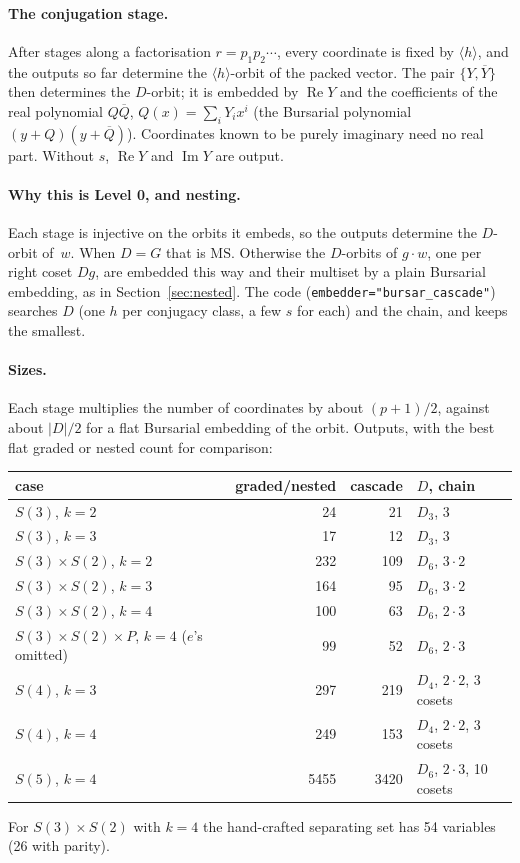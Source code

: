 \documentclass[11pt]{article}
\theoremstyle{definition}
\theoremstyle{remark}
\newcommand{\MS}{\mathrm{MS}}
\begin{document}
\paragraph{The conjugation stage.}
After stages along a factorisation $r = p_1 p_2 \cdots$, every coordinate is
fixed by $\langle h\rangle$, and the outputs so far determine the
$\langle h\rangle$-orbit of the packed vector. The pair $\{Y, \overline{Y}\}$
then determines the $D$-orbit; it is embedded by $\operatorname{Re} Y$ and the
coefficients of the real polynomial $Q\overline{Q}$, $Q(x) = \sum_i Y_i x^i$
(the Bursarial polynomial $(y+Q)(y+\overline{Q})$). Coordinates known to be
purely imaginary need no real part. Without $s$, $\operatorname{Re} Y$ and
$\operatorname{Im} Y$ are output.

\paragraph{Why this is Level 0, and nesting.}
Each stage is injective on the orbits it embeds, so the outputs determine the
$D$-orbit of~$w$. When $D = G$ that is $\MS$. Otherwise the $D$-orbits of
$g\cdot w$, one per right coset $Dg$, are embedded this way and their multiset by
a plain Bursarial embedding, as in Section~\ref{sec:nested}. The code
(\texttt{embedder="bursar\_cascade"}) searches $D$ (one $h$ per conjugacy class,
a few $s$ for each) and the chain, and keeps the smallest.

\paragraph{Sizes.}
Each stage multiplies the number of coordinates by about $(p+1)/2$, against
about $|D|/2$ for a flat Bursarial embedding of the orbit. Outputs, with the best
flat graded or nested count for comparison:
\begin{center}
\small
\begin{tabular}{lrrl}
  case & graded/nested & cascade & $D$, chain \\ \hline
  $S(3)$, $k = 2$                    & 24   & 21   & $D_3$, $3$ \\
  $S(3)$, $k = 3$                    & 17   & 12   & $D_3$, $3$ \\
  $S(3)\times S(2)$, $k = 2$         & 232  & 109  & $D_6$, $3\cdot 2$ \\
  $S(3)\times S(2)$, $k = 3$         & 164  & 95   & $D_6$, $3\cdot 2$ \\
  $S(3)\times S(2)$, $k = 4$         & 100  & 63   & $D_6$, $2\cdot 3$ \\
  $S(3)\times S(2)\times P$, $k = 4$ ($e$'s omitted) & 99 & 52 & $D_6$, $2\cdot 3$ \\
  $S(4)$, $k = 3$                    & 297  & 219  & $D_4$, $2\cdot 2$, 3 cosets \\
  $S(4)$, $k = 4$                    & 249  & 153  & $D_4$, $2\cdot 2$, 3 cosets \\
  $S(5)$, $k = 4$                    & 5455 & 3420 & $D_6$, $2\cdot 3$, 10 cosets
\end{tabular}
\end{center}
For $S(3)\times S(2)$ with $k = 4$ the hand-crafted separating set has 54
variables \cite{GHL20,LHG22} (26 with parity).
\end{document}
